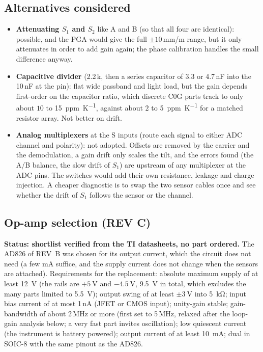 \documentclass[11pt,a4paper]{article}
\begin{document}
\subsection{Alternatives considered}

\begin{itemize}
  \item \textbf{Attenuating $S_1$ and $S_2$} like A and B (so that all four are identical):
        possible, and the PGA would give the full $\pm10$\,mm/m range, but it only
        attenuates in order to add gain again; the phase calibration handles the small
        difference anyway.
  \item \textbf{Capacitive divider} (2.2\,k, then a series capacitor of 3.3 or 4.7\,nF into
        the 10\,nF at the pin): flat wide passband and light load, but the gain depends
        first-order on the capacitor ratio, which discrete C0G parts track to only about
        $10$ to \SI{15}{ppm\per\kelvin}, against about $2$ to \SI{5}{ppm\per\kelvin} for a
        matched resistor array.  Not better on drift.
  \item \textbf{Analog multiplexers} at the S inputs (route each signal to either ADC channel
        and polarity): not adopted.  Offsets are removed by the carrier and the demodulation,
        a gain drift only scales the tilt, and the errors found (the A/B balance, the slow
        drift of $S_1$) are upstream of any multiplexer at the ADC pins.  The switches would
        add their own resistance, leakage and charge injection.  A cheaper diagnostic is to swap
        the two sensor cables once and see whether the drift of $S_1$ follows the sensor or the
        channel.
\end{itemize}

\subsection{Op-amp selection (REV C)}

\textbf{Status: shortlist verified from the TI datasheets, no part ordered.}  The AD826 of
REV~B was chosen for its output current, which the circuit does not need (a few mA suffice, and
the supply current does not change when the sensors are attached).  Requirements for the
replacement: absolute maximum supply of at least \SI{12}{\volt} (the rails are
$+\SI{5}{\volt}$ and $-\SI{4.5}{\volt}$, \SI{9.5}{\volt} in total, which excludes the many parts
limited to \SI{5.5}{\volt}); output swing of at least $\pm\SI{3}{\volt}$ into \SI{5}{\kilo\ohm};
input bias current of at most 1\,nA (JFET or CMOS input); unity-gain stable; gain-bandwidth of
about 2\,MHz or more (first set to 5\,MHz, relaxed after the loop-gain analysis below; a very
fast part invites oscillation); low quiescent current (the instrument is battery powered);
output current of at least \SI{10}{\milli\ampere}; dual in SOIC-8 with the same pinout as the
AD826.
\end{document}
